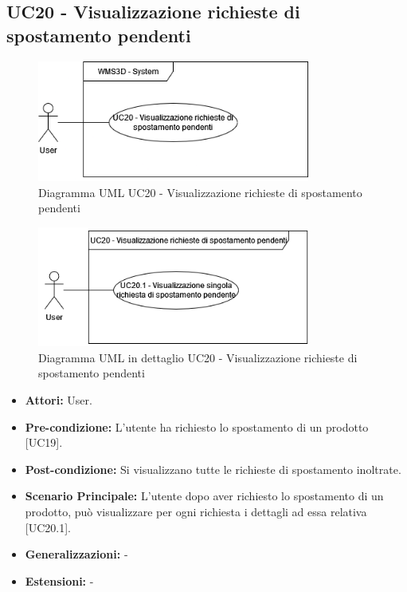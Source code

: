 \subsection{UC20 - Visualizzazione richieste di spostamento pendenti}
\begin{figure}[H]
  \centering
  \includegraphics[width=0.8\textwidth]{UC_diagrams_11-20/UC20_sys.drawio.png}
   \caption{Diagramma UML UC20 - Visualizzazione richieste di spostamento pendenti}
\end{figure}
\begin{figure}[H]
  \centering
  \includegraphics[width=0.8\textwidth]{UC_diagrams_11-20/UC20.drawio.png}
   \caption{Diagramma UML in dettaglio UC20 - Visualizzazione richieste di spostamento pendenti}
\end{figure}
\begin{itemize}
    \item \textbf{Attori:} User.
    \item \textbf{Pre-condizione:}  L'utente ha richiesto lo spostamento di un prodotto [UC19].
    \item \textbf{Post-condizione:} Si visualizzano tutte le richieste di spostamento inoltrate.
    \item \textbf{Scenario Principale:} L'utente dopo aver richiesto lo spostamento di un prodotto, può visualizzare per ogni richiesta i dettagli ad essa relativa [UC20.1].
    \item \textbf{Generalizzazioni:} -
    \item \textbf{Estensioni:} -
\end{itemize}



